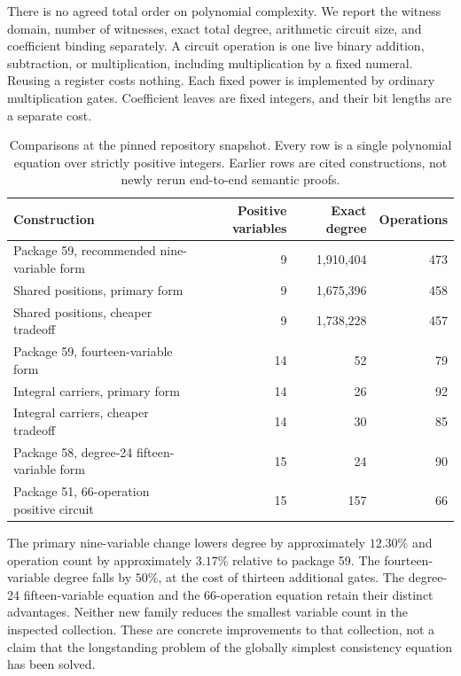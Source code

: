 \documentclass[11pt,a4paper]{article}
\theoremstyle{definition}\newtheorem{definition}[theorem]{Definition}
\theoremstyle{remark}\newtheorem{remark}[theorem]{Remark}
\begin{document}
There is no agreed total order on polynomial complexity. We report the
witness domain, number of witnesses, exact total degree, arithmetic circuit
size, and coefficient binding separately. A circuit operation is one live
binary addition, subtraction, or multiplication, including multiplication
by a fixed numeral. Reusing a register costs nothing. Each fixed power is
implemented by ordinary multiplication gates. Coefficient leaves are fixed
integers, and their bit lengths are a separate cost.

\begin{table}[htbp]\centering\small
\begin{tabular}{@{}lrrr@{}}\toprule
Construction & Positive variables & Exact degree & Operations\\\midrule
Package 59, recommended nine-variable form~\cite{p59} & 9 & 1,910,404 & 473\\
Shared positions, primary form & 9 & 1,675,396 & 458\\
Shared positions, cheaper tradeoff & 9 & 1,738,228 & 457\\
Package 59, fourteen-variable form~\cite{p59} & 14 & 52 & 79\\
Integral carriers, primary form & 14 & 26 & 92\\
Integral carriers, cheaper tradeoff & 14 & 30 & 85\\
Package 58, degree-24 fifteen-variable form~\cite{p58} & 15 & 24 & 90\\
Package 51, 66-operation positive circuit~\cite{p51} & 15 & 157 & 66\\
\bottomrule\end{tabular}
\caption{Comparisons at the pinned repository snapshot. Every row is a
single polynomial equation over strictly positive integers. Earlier rows
are cited constructions, not newly rerun end-to-end semantic proofs.}
\label{tab:main}
\end{table}

The primary nine-variable change lowers degree by approximately $12.30\%$
and operation count by approximately $3.17\%$ relative to package 59.
The fourteen-variable degree falls by $50\%$, at the cost of thirteen
additional gates. The degree-24 fifteen-variable equation and the
66-operation equation retain their distinct advantages. Neither new
family reduces the smallest variable count in the inspected collection.
These are concrete improvements to that collection, not a claim that the
longstanding problem of the globally simplest consistency equation has
been solved.
\end{document}
